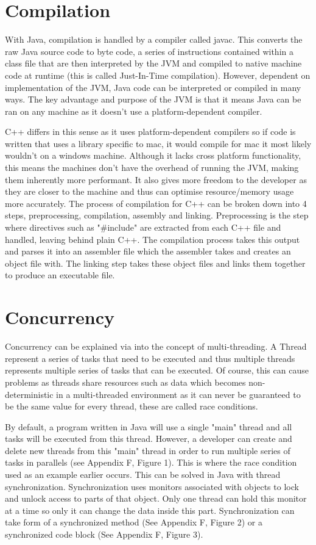 \documentclass[]{report}
\begin{document}
\section{Compilation}
With Java, compilation is handled by a compiler called javac. This converts the raw Java source code to byte code, a series of instructions contained within a class file that are then interpreted by the JVM and compiled to native machine code at runtime (this is called Just-In-Time compilation). However, dependent on implementation of the JVM, Java code can be interpreted or compiled in many ways. The key advantage and purpose of the JVM is that it means Java can be ran on any machine as it doesn't use a platform-dependent compiler. \cite{Compilation}

C++ differs in this sense as it uses platform-dependent compilers so if code is written that uses a library specific to mac, it would compile for mac it most likely wouldn't on a windows machine. Although it lacks cross platform functionality, this means the machines don't have the overhead of running the JVM, making them inherently more performant. It also gives more freedom to the developer as they are closer to the machine	and thus can optimise resource/memory usage more accurately. The process of compilation for C++ can be broken down into 4 steps, preprocessing, compilation, assembly and linking. Preprocessing is the step where directives such as "\#include" are extracted from each C++ file and handled, leaving behind plain C++. The compilation process takes this output and parses it into an assembler file which the assembler takes and creates an object file with. The linking step takes these object files and links them together to produce an executable file. \cite{Compilation}

\section{Concurrency}
Concurrency can be explained via into the concept of multi-threading. A Thread represent a series of tasks that need to be executed and thus multiple threads represents multiple series of tasks that can be executed.  Of course, this can cause problems as threads share resources such as data which becomes non-deterministic in a multi-threaded environment as it can never be guaranteed to be the same value for every thread, these are called race conditions.

By default, a program written in Java will use a single "main" thread and all tasks will be executed from this thread. However, a developer can create and delete new threads from this "main" thread in order to run multiple series of tasks in parallels (see Appendix F, Figure 1). This is where the race condition used as an example earlier occurs. This can be solved in Java with thread synchronization. Synchronization uses monitors associated with objects to lock and unlock access to parts of that object. Only one thread can hold this monitor at a time so only it can change the data inside this part. Synchronization can take form of a synchronized method (See Appendix F, Figure 2) or a synchronized code block (See Appendix F, Figure 3).\cite{ConcurrencyJava}
\end{document}
